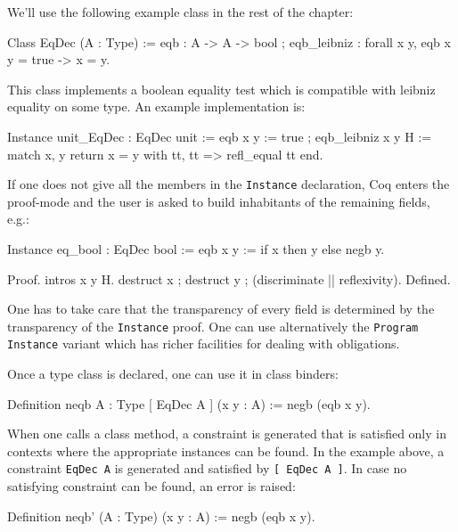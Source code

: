 We'll use the following example class in the rest of the chapter:

\begin{coq_example*}
Class EqDec (A : Type) :=
  eqb : A -> A -> bool ;
  eqb_leibniz : forall x y, eqb x y = true -> x = y.
\end{coq_example*}

This class implements a boolean equality test which is compatible with
leibniz equality on some type. An example implementation is:

\begin{coq_example*}
Instance unit_EqDec : EqDec unit :=
  eqb x y := true ;
  eqb_leibniz x y H := 
    match x, y return x = y with tt, tt => refl_equal tt end.
\end{coq_example*}

If one does not give all the members in the \texttt{Instance}
declaration, Coq enters the proof-mode and the user is asked to build
inhabitants of the remaining fields, e.g.:

\begin{coq_example*}
Instance eq_bool : EqDec bool :=
  eqb x y := if x then y else negb y.
\end{coq_example*}

\begin{coq_example}
Proof. intros x y H.
  destruct x ; destruct y ; (discriminate || reflexivity). 
Defined.
\end{coq_example}

One has to take care that the transparency of every field is determined
by the transparency of the \texttt{Instance} proof. One can use
alternatively the \texttt{Program} \texttt{Instance}  variant which has
richer facilities for dealing with obligations.


Once a type class is declared, one can use it in class binders:
\begin{coq_example}
  Definition neqb {A : Type} [ EqDec A ] (x y : A) := negb (eqb x y).
\end{coq_example}

When one calls a class method, a constraint is generated that is
satisfied only in contexts where the appropriate instances can be
found. In the example above, a constraint \texttt{EqDec A} is generated and
satisfied by \texttt{[ EqDec A ]}. In case no satisfying constraint can be
found, an error is raised:

\begin{coq_example}
  Definition neqb' (A : Type) (x y : A) := negb (eqb x y).
\end{coq_example}

